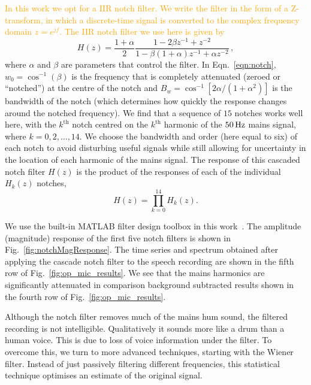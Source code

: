 \documentclass[aps,pra,superscriptaddress,reprint,nofootinbib]{revtex4-1}
\newcommand{\han}{\textcolor{orange}}
\begin{document}
\han{In this work we opt for a IIR notch filter. 
We write the filter in the form of a Z-transform, in which a discrete-time signal is converted to the complex frequency domain $z=e^{jf}$. 
The IIR notch filter we use here is given by~\citep{10.5555/541204} }
\begin{equation}
    \label{eqn:notch}
    H(z)=\frac{1+\alpha}{2}\frac{1-2\beta z^{-1}+z^{-2}}{1-\beta(1+\alpha)z^{-1}+\alpha z^{-2}}\,,
\end{equation}
where $\alpha$ and $\beta$ are parameters that control the filter. 
In Eqn.~\ref{eqn:notch}, $w_0=\cos^{-1}(\beta)$ is the frequency that is completely attenuated (zeroed or ``notched'') at the centre of the notch and $B_w=\cos^{-1}[2\alpha/(1+\alpha^2)]$ is the bandwidth of the notch (which determines how quickly the response changes around the notched frequency).
We find that a sequence of $15$ notches works well here, with the $k^\mathrm{th}$ notch centred on the $k^\mathrm{th}$ harmonic of the $50\,{\rm Hz}$ mains signal, where $k=0,2,\dots,14$. 
We choose the bandwidth and order (here equal to six) of each notch to avoid disturbing useful signals while still allowing for uncertainty in the location of each harmonic of the mains signal. The response of this cascaded notch filter $H(z)$ is the product of the responses of each of the individual $H_k(z)$ notches,
\begin{equation}
    \label{eqn:notch15}
    H(z) = \prod_{k=0}^{14} H_k(z).
\end{equation}

We use the built-in MATLAB filter design toolbox in this work~\cite{MATLAB}. 
The amplitude (magnitude) response of the first five notch filters is shown in Fig.~\ref{fig:notchMagResponse}. 
The time series and spectrum obtained after applying the cascade notch filter to the speech recording are shown in the fifth row of Fig.~\ref{fig:op_mic_results}.
We see that the mains harmonics are significantly attenuated in comparison background subtracted results shown in the fourth row of Fig.~\ref{fig:op_mic_results}.

Although the notch filter removes much of the mains hum sound, the filtered recording is not intelligible. Qualitatively it sounds more like a drum than a human voice. This is due to loss of voice information under the filter.
To overcome this, we turn to more advanced techniques, starting with the Wiener filter. Instead of just passively filtering different frequencies, this statistical technique optimises an estimate of the original signal. 
\end{document}
